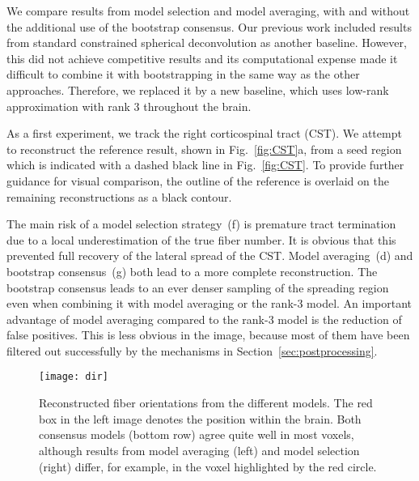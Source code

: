 We compare results from model selection and model averaging, with and without the additional use of the bootstrap consensus. Our previous work \cite{Gruen:2021} included results from standard constrained spherical deconvolution as another baseline. However, this did not achieve competitive results and its computational expense made it difficult to combine it with bootstrapping in the same way as the other approaches. Therefore, we replaced it by a new baseline, which uses low-rank approximation with rank 3 throughout the brain.

As a first experiment, we track the right corticospinal tract (CST). We attempt to reconstruct the reference result, shown in Fig.~\ref{fig:CST}a, from a seed
region which is indicated with a dashed black line in Fig.~\ref{fig:CST}. To provide further guidance for visual comparison, the outline of the reference is overlaid on the remaining reconstructions as a black contour.

The main risk of a model selection strategy~(f) is premature tract termination due to a local underestimation of the true fiber number. It is obvious that this prevented full recovery of the lateral spread of the CST. Model averaging~(d) and bootstrap consensus~(g) both lead to a more complete reconstruction. The bootstrap consensus leads to an ever denser sampling of the spreading region even when combining it with model averaging or the rank-3 model. An important advantage of model averaging compared to the rank-3 model is the reduction of false positives. This is less obvious in the image, because most of them have been filtered out successfully by the mechanisms in Section~\ref{sec:postprocessing}.

\begin{figure*}
	\centering
	\texttt{[image: dir]}
	\caption{Reconstructed fiber orientations from the different models. The
          red box in the left image denotes the position within the brain. Both consensus
          models (bottom row) agree quite well in most voxels, although results from model averaging (left) and model selection (right) differ, for example, in the voxel highlighted by the red circle.}
	\label{fig:directions}
\end{figure*}

